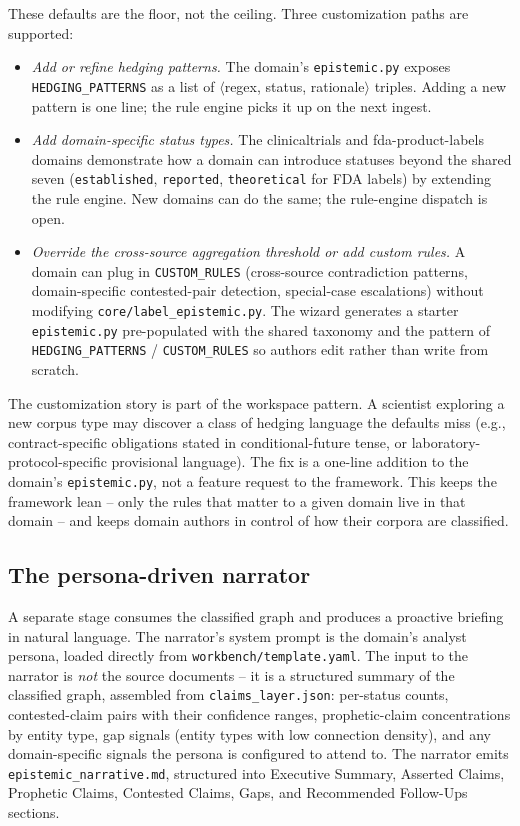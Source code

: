 These defaults are the floor, not the ceiling. Three customization paths are supported:

\begin{itemize}
\item \emph{Add or refine hedging patterns.} The domain's \texttt{epistemic.py} exposes \texttt{HEDGING\_PATTERNS} as a list of $\langle$regex, status, rationale$\rangle$ triples. Adding a new pattern is one line; the rule engine picks it up on the next ingest.
\item \emph{Add domain-specific status types.} The clinicaltrials and fda-product-labels domains demonstrate how a domain can introduce statuses beyond the shared seven (\texttt{established}, \texttt{reported}, \texttt{theoretical} for FDA labels) by extending the rule engine. New domains can do the same; the rule-engine dispatch is open.
\item \emph{Override the cross-source aggregation threshold or add custom rules.} A domain can plug in \texttt{CUSTOM\_RULES} (cross-source contradiction patterns, domain-specific contested-pair detection, special-case escalations) without modifying \texttt{core/label\_epistemic.py}. The wizard generates a starter \texttt{epistemic.py} pre-populated with the shared taxonomy and the pattern of \texttt{HEDGING\_PATTERNS} / \texttt{CUSTOM\_RULES} so authors edit rather than write from scratch.
\end{itemize}

The customization story is part of the workspace pattern. A scientist exploring a new corpus type may discover a class of hedging language the defaults miss (e.g., contract-specific obligations stated in conditional-future tense, or laboratory-protocol-specific provisional language). The fix is a one-line addition to the domain's \texttt{epistemic.py}, not a feature request to the framework. This keeps the framework lean -- only the rules that matter to a given domain live in that domain -- and keeps domain authors in control of how their corpora are classified.

\subsection{The persona-driven narrator}

A separate stage consumes the classified graph and produces a proactive briefing in natural language. The narrator's system prompt is the domain's analyst persona, loaded directly from \texttt{workbench/template.yaml}. The input to the narrator is \emph{not} the source documents -- it is a structured summary of the classified graph, assembled from \texttt{claims\_layer.json}: per-status counts, contested-claim pairs with their confidence ranges, prophetic-claim concentrations by entity type, gap signals (entity types with low connection density), and any domain-specific signals the persona is configured to attend to. The narrator emits \texttt{epistemic\_narrative.md}, structured into Executive Summary, Asserted Claims, Prophetic Claims, Contested Claims, Gaps, and Recommended Follow-Ups sections.

